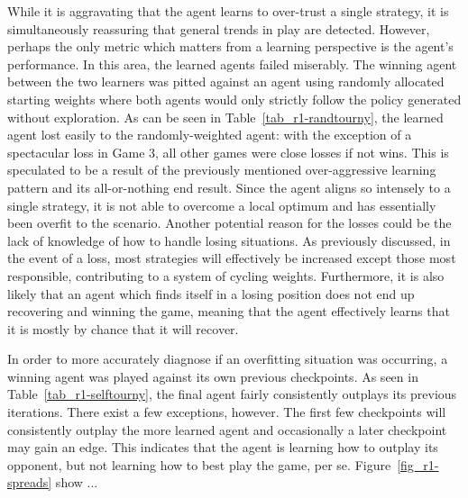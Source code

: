 While it is
aggravating that the agent learns to over-trust a single strategy,
it is simultaneously reassuring that general trends in play are detected.
%
However, perhaps the only metric which matters from a learning perspective is
the agent's performance.
%
In this area, the learned agents failed miserably.
%
The winning agent between the two learners was pitted against
an agent using randomly allocated starting weights
where both agents would only strictly follow the policy generated
without exploration.
%
As can be seen in Table~\ref{tab_r1-randtourny},
the learned agent lost easily to the randomly-weighted agent:
with the exception of a spectacular loss in Game 3,
all other games were close losses if not wins.
%
This is speculated to be a result of the previously mentioned over-aggressive
learning pattern and its all-or-nothing end result.
%
Since the agent aligns so intensely to a single strategy,
it is not able to overcome a local optimum
and has essentially been overfit to the scenario.
%
Another potential reason for the losses could be the lack of knowledge of how to
handle losing situations.
%
As previously discussed,
in the event of a loss,
most strategies will effectively be increased except those most responsible,
contributing to a system of cycling weights.
%
Furthermore, it is also likely that an agent which finds itself in a losing
position does not end up recovering and winning the game,
meaning that
the agent effectively learns that it is mostly by chance that it will recover.




In order to more accurately diagnose if an overfitting situation was occurring,
a winning agent was played against its own previous checkpoints.
%
As seen in Table~\ref{tab_r1-selftourny},
the final agent fairly consistently outplays its previous iterations.
%
There exist a few exceptions, however.
%
The first few checkpoints will consistently outplay the more learned agent
and occasionally a later checkpoint may gain an edge.
%
This indicates that the agent is learning how to outplay its opponent,
but not learning how to best play the game, per se.
%
Figure~\ref{fig_r1-spreads} show ...




